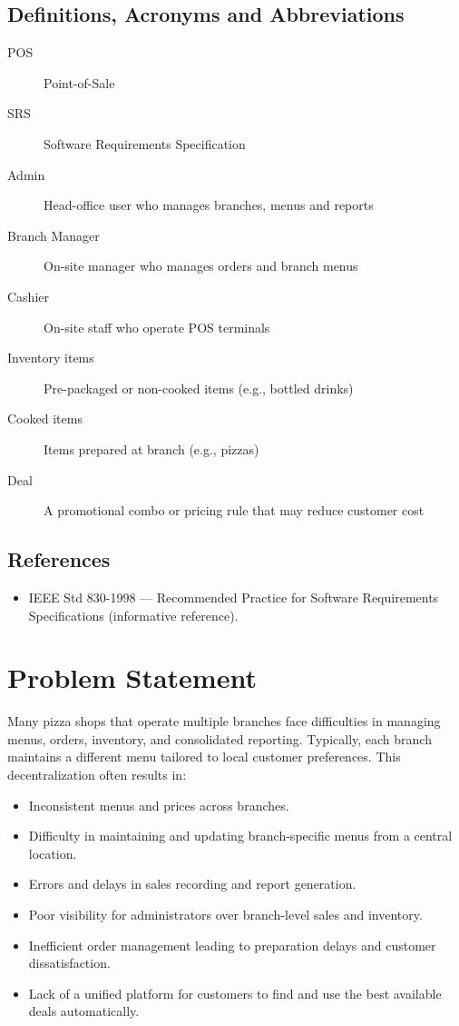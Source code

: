 \documentclass[12pt,a4paper]{article}
\begin{document}
\subsection{Definitions, Acronyms and Abbreviations}
\begin{description}
    \item[POS] Point-of-Sale
    \item[SRS] Software Requirements Specification
    \item[Admin] Head-office user who manages branches, menus and reports
    \item[Branch Manager] On-site manager who manages orders and branch menus
    \item[Cashier] On-site staff who operate POS terminals
    \item[Inventory items] Pre-packaged or non-cooked items (e.g., bottled drinks)
    \item[Cooked items] Items prepared at branch (e.g., pizzas)
    \item[Deal] A promotional combo or pricing rule that may reduce customer cost
\end{description}

\subsection{References}
\begin{itemize}
    
    \item IEEE Std 830-1998 --- Recommended Practice for Software Requirements Specifications (informative reference).
\end{itemize}

\section{Problem Statement}
Many pizza shops that operate multiple branches face difficulties in managing menus, orders, inventory, and consolidated reporting. Typically, each branch maintains a different menu tailored to local customer preferences. This decentralization often results in:
\begin{itemize}
    \item Inconsistent menus and prices across branches.
    \item Difficulty in maintaining and updating branch-specific menus from a central location.
    \item Errors and delays in sales recording and report generation.
    \item Poor visibility for administrators over branch-level sales and inventory.
    \item Inefficient order management leading to preparation delays and customer dissatisfaction.
    \item Lack of a unified platform for customers to find and use the best available deals automatically.
\end{itemize}
\end{document}
